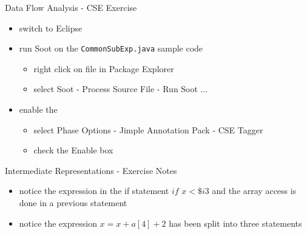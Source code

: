 \documentclass[mcgill,slideColor,colorBG,pdf]{prosper}
\begin{document}
\begin{slide} {Data Flow Analysis - CSE Exercise}
\begin{itemize}
\item switch to Eclipse
\item run Soot on the \texttt{CommonSubExp.java} sample code
\begin{itemize}
\item right click on file in Package Explorer
\item select Soot - Process Source File - Run Soot ...
\end{itemize}
\item enable the 
\begin{itemize}
\item select Phase Options - Jimple Annotation Pack - CSE Tagger
\item check the Enable box
\end{itemize}
\end{itemize}
\end{slide}

\begin{slide} {Intermediate Representations - Exercise Notes}
\begin{itemize}
\item notice the expression in the if statement $if$ $x < \$i3$ and the array access is done in a previous statement
\item notice the expression $x = x + a[4] + 2$ has been split into three statements
\end{itemize}
\end{slide}
\end{document}
